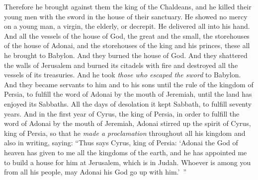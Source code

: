 \begin{biblechapter}
 Therefore he brought against them the king of the Chaldeans, and he killed their young men with the sword in the house of their sanctuary. He showed no mercy on a young man, a virgin, the elderly, or decrepit. He delivered all into his hand.
\verse And all the vessels of the house of God, the great and the small, the storehouses of the house of Adonai, and the storehouses of the king and his princes, these all he brought to Babylon.
\verse And they burned the house of God. And they shattered the walls of Jerusalem and burned its citadels with fire and destroyed all the vessels of its treasuries.
\verse And he took \textit{those who escaped the sword} to Babylon. And they became servants to him and to his sons until the rule of the kingdom of Persia,
\verse to fulfill the word of Adonai by the mouth of Jeremiah, until the land has enjoyed its Sabbaths. All the days of desolation it kept Sabbath, to fulfill seventy years.
 And in the first year of Cyrus, the king of Persia, in order to fulfill the word of Adonai by the mouth of Jeremiah, Adonai stirred up the spirit of Cyrus, king of Persia, so that he \textit{made a proclamation} throughout all his kingdom and also in writing, saying:
\verse “Thus says Cyrus, king of Persia: ‘Adonai the God of heaven has given to me all the kingdoms of the earth, and he has appointed me to build a house for him at Jerusalem, which is in Judah. Whoever is among you from all his people, may Adonai his God go up with him.’ ”
\end{biblechapter}

